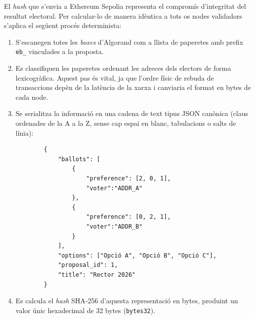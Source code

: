 El \textit{hash} que s'envia a Ethereum Sepolia representa el compromís d'integritat del resultat electoral.
Per calcular-lo de manera idèntica a tots os nodes validadors s'aplica el següent procés determinista:

\begin{enumerate}
    \item S'escanegen totes les \textit{boxes} d'Algorand com a llista de paperetes amb prefix \texttt{eb\_} vinculades
    a la proposta.

    \item Es classifiquen les paperetes ordenant les adreces dels electors de forma lexicogràfica.
    Aquest pas és vital, ja que l'ordre físic de rebuda de transaccions depèn de la latència de la xarxa i canviaria el
    format en bytes de cada node.

    \item Se serialitza la informació en una cadena de text tipus \ac{JSON} canònica (claus ordenades de la A a la Z,
    sense cap espai en blanc, tabulacions o salts de línia):
    \begin{verbatim}
        {
            "ballots": [
                {
                    "preference": [2, 0, 1],
                    "voter":"ADDR_A"
                },
                {
                    "preference": [0, 2, 1],
                    "voter":"ADDR_B"
                }
            ],
            "options": ["Opció A", "Opció B", "Opció C"],
            "proposal_id": 1,
            "title": "Rector 2026"
        }
    \end{verbatim}

    \item Es calcula el \textit{hash} \ac{SHA}-256 d'aquesta representació en bytes, produint un valor únic hexadecimal
    de 32 bytes (\texttt{bytes32}).
\end{enumerate}
